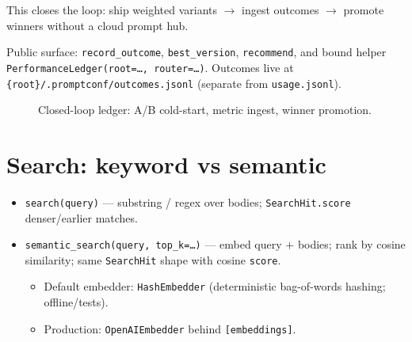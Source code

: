 \documentclass[11pt,a4paper]{article}
\newcommand{\code}[1]{\texttt{#1}}
\begin{document}
This closes the loop: ship weighted variants $\rightarrow$ ingest outcomes
$\rightarrow$ promote winners without a cloud prompt hub.

Public surface: \code{record\_outcome}, \code{best\_version},
\code{recommend}, and bound helper
\code{PerformanceLedger(root=\ldots, router=\ldots)}. Outcomes live at
\code{\{root\}/.promptconf/outcomes.jsonl} (separate from
\code{usage.jsonl}).

\begin{figure}[htbp]
  \centering
  \caption{Closed-loop ledger: A/B cold-start, metric ingest, winner promotion.}
  \label{fig:ledger-loop}
\end{figure}

\section{Search: keyword vs semantic}

\begin{itemize}[leftmargin=*]
  \item \code{search(query)} --- substring / regex over bodies;
        \code{SearchHit.score} denser/earlier matches.
  \item \code{semantic\_search(query, top\_k=\ldots)} --- embed query $+$
        bodies; rank by cosine similarity; same \code{SearchHit} shape with
        cosine \code{score}.
        \begin{itemize}
          \item Default embedder: \code{HashEmbedder} (deterministic
                bag-of-words hashing; offline/tests).
          \item Production: \code{OpenAIEmbedder} behind
                \code{[embeddings]}.
        \end{itemize}
\end{itemize}
\end{document}
